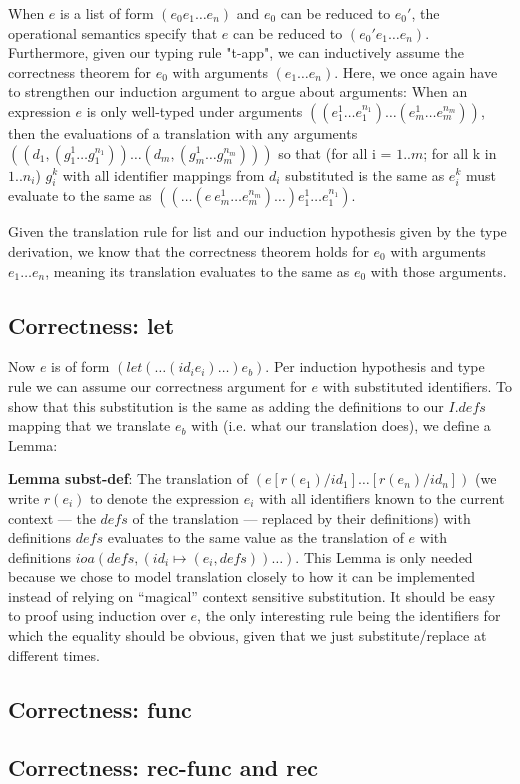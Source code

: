 \documentclass[letterpaper,12pt]{article}
\begin{document}
When $e$ is a list of form $(e_0 e_1 \dots e_n)$ and $e_0$ can be reduced
to $e_0'$, the operational semantics specify that $e$ can be reduced to
$(e_0' e_1 \dots e_n)$. Furthermore, given our typing rule "t-app",
we can inductively assume the correctness theorem for $e_0$ with arguments
$(e_1 \dots e_n)$. Here, we once again have to strengthen our induction
argument to argue about arguments: When an expression $e$ is only
well-typed under arguments $((e_1^1 \dots e_1^{n_1}) \dots (e_m^1 \dots e_m^{n_m}))$,
then the evaluations of a translation with any arguments 
$((d_1, (g_1^1 \dots g_1^{n_1})) \dots (d_m, (g_m^1 \dots g_m^{n_m})))$
so that (for all i = $1..m$; for all k in $1..n_i$) $g_i^k$ with all identifier
mappings from $d_i$ substituted is the same as $e_i^k$ must evaluate
to the same as $((\dots(e\: e_m^1 \dots e_m^{n_m}) \dots) e_1^1 \dots e_1^{n_1})$.

Given the translation rule for list and our induction hypothesis
given by the type derivation, we know that the correctness theorem
holds for $e_0$ with arguments $e_1 \dots e_n$, meaning its translation
evaluates to the same as $e_0$ with those arguments.

\subsection{Correctness: let}

Now $e$ is of form $(let (\dots(id_i e_i)\dots) e_b)$. 
Per induction hypothesis and type rule we can assume our correctness argument
for $e$ with substituted identifiers. To show that this substitution
is the same as adding the definitions to our $I.defs$ mapping that
we translate $e_b$ with (i.e. what our translation does), we define a Lemma:

\textbf{Lemma subst-def}: The translation of $(e[r(e_1) / id_1]\dots[r(e_n) / id_n])$
(we write $r(e_i)$ to denote the expression $e_i$ with all identifiers
known to the current context --- the $defs$ of the translation --- replaced
by their definitions) with definitions $defs$ evaluates to
the same value as the translation of $e$ with
definitions $ioa(defs, (id_i \mapsto (e_i, defs)) \dots)$. This Lemma
is only needed because we chose to model translation closely
to how it can be implemented instead of relying on ``magical''
context sensitive substitution. It should be easy to proof using
induction over $e$, the only interesting rule being the
identifiers for which the equality should be obvious, given that
we just substitute/replace at different times.

\subsection{Correctness: func}

\subsection{Correctness: rec-func and rec}
\end{document}
